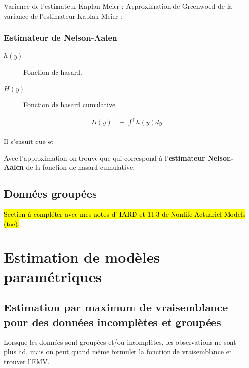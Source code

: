 \documentclass[10pt, french]{article}
\begin{document}
\begin{multicols*}{2}
Variance de l'estimateur Kaplan-Meier :  
Approximation de Greenwood de la variance de l'estimateur Kaplan-Meier :  


\subsubsection{Estimateur de Nelson-Aalen}
\begin{distributions}[Notation]
\begin{description}
	\item[$h(y)$]	Fonction de hasard.
	\item[$H(y)$]	Fonction de hasard cumulative.
\end{description}
\end{distributions} 

\begin{align*}
	H(y)
	&=	\int_{0}^{y} h(y) dy
\end{align*}

Il s'ensuit que  et .

Avec l'approximation  on trouve que  qui correspond à l'\textbf{estimateur Nelson-Aalen} de la fonction de hasard cumulative.

\columnbreak
\subsection{Données groupées}
\hl{Section à compléter avec mes notes d’ IARD et 11.3 de Nonlife Actuariel Models (tse).}



\pagebreak
\section{Estimation de modèles paramétriques}
\subsection*{Estimation par maximum de vraisemblance pour des données incomplètes et groupées}
Lorsque les données sont groupées et/ou incomplètes, les observations ne sont plus iid, mais on peut quand même formuler la fonction de vraisemblance et trouver l'EMV.


\end{multicols*}
\end{document}
